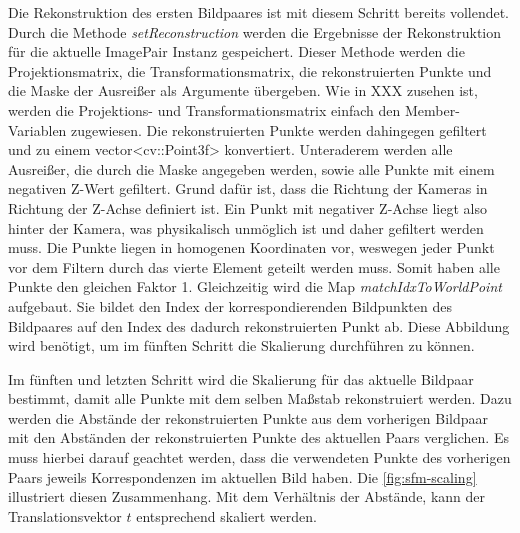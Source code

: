 Die Rekonstruktion des ersten Bildpaares ist mit diesem Schritt bereits vollendet.
Durch die Methode \emph{setReconstruction} werden die Ergebnisse der Rekonstruktion für die aktuelle ImagePair Instanz gespeichert.
Dieser Methode werden die Projektionsmatrix, die Transformationsmatrix, die rekonstruierten Punkte und die Maske der Ausreißer als Argumente übergeben. 
Wie in XXX zusehen ist, werden die Projektions- und Transformationsmatrix einfach den Member-Variablen zugewiesen.
Die rekonstruierten Punkte werden dahingegen gefiltert und zu einem vector<cv::Point3f> konvertiert.
Unteraderem werden alle Ausreißer, die durch die Maske angegeben werden, sowie alle Punkte mit einem negativen Z-Wert gefiltert.
Grund dafür ist, dass die Richtung der Kameras in Richtung der Z-Achse definiert ist.
Ein Punkt mit negativer Z-Achse liegt also hinter der Kamera, was physikalisch unmöglich ist und daher gefiltert werden muss.
Die Punkte liegen in homogenen Koordinaten vor, weswegen jeder Punkt vor dem Filtern durch das vierte Element geteilt werden muss.
Somit haben alle Punkte den gleichen Faktor 1.
Gleichzeitig wird die Map \emph{matchIdxToWorldPoint} aufgebaut.
Sie bildet den Index der korrespondierenden Bildpunkten des Bildpaares auf den Index des dadurch rekonstruierten Punkt ab.
Diese Abbildung wird benötigt, um im fünften Schritt die Skalierung durchführen zu können.

Im fünften und letzten Schritt wird die Skalierung für das aktuelle Bildpaar bestimmt, damit alle Punkte mit dem selben Maßstab rekonstruiert werden.  
Dazu werden die Abstände der rekonstruierten Punkte aus dem vorherigen Bildpaar mit den Abständen der rekonstruierten Punkte des aktuellen Paars verglichen.
Es muss hierbei darauf geachtet werden, dass die verwendeten Punkte des vorherigen Paars jeweils Korrespondenzen im aktuellen Bild haben.
Die \cref{fig:sfm-scaling} illustriert diesen Zusammenhang.
Mit dem Verhältnis der Abstände, kann der Translationsvektor $t$ entsprechend skaliert werden.


